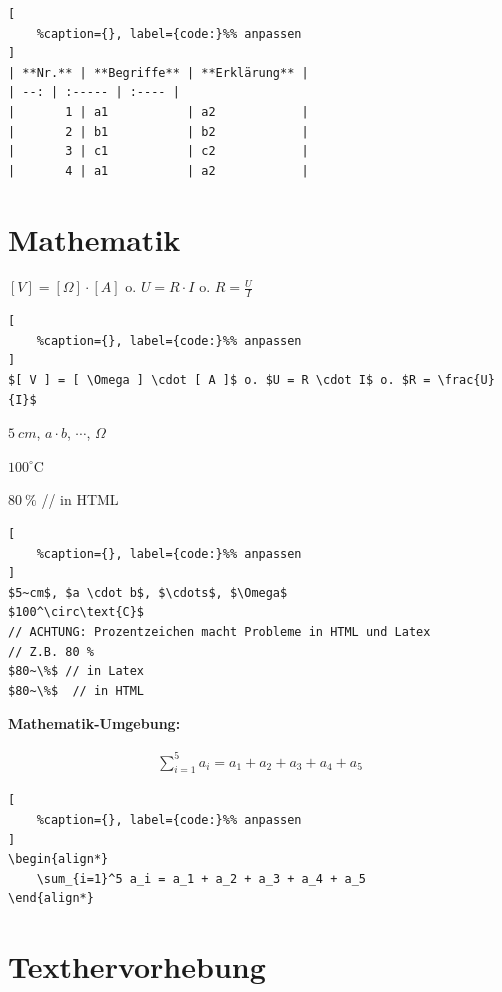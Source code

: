 \lstset{language=Bash}%
\begin{lstlisting}[
	%caption={}, label={code:}%% anpassen
]
| **Nr.** | **Begriffe** | **Erklärung** |
| --: | :----- | :---- |
|       1 | a1           | a2            |
|       2 | b1           | b2            |
|       3 | c1           | c2            |
|       4 | a1           | a2            |
\end{lstlisting}

\section{Mathematik}\label{mathematik}

$[ V ] = [ \Omega ] \cdot [ A ]$ o. $U = R \cdot I$ o.
$R = \frac{U}{I}$

\lstset{language=Bash}%
\begin{lstlisting}[
	%caption={}, label={code:}%% anpassen
]
$[ V ] = [ \Omega ] \cdot [ A ]$ o. $U = R \cdot I$ o. $R = \frac{U}{I}$
\end{lstlisting}

$5~cm$, $a \cdot b$, $\cdots$, $\Omega$

$100^\circ\text{C}$

$80~\%$ // in HTML

\lstset{language=Bash}%
\begin{lstlisting}[
	%caption={}, label={code:}%% anpassen
]
$5~cm$, $a \cdot b$, $\cdots$, $\Omega$
$100^\circ\text{C}$  
// ACHTUNG: Prozentzeichen macht Probleme in HTML und Latex 
// Z.B. 80 %
$80~\%$ // in Latex
$80~\%$  // in HTML
\end{lstlisting}

\textbf{Mathematik-Umgebung:}

\begin{align*}
    \sum_{i=1}^5 a_i = a_1 + a_2 + a_3 + a_4 + a_5
\end{align*}

\lstset{language=Bash}%
\begin{lstlisting}[
	%caption={}, label={code:}%% anpassen
]
\begin{align*}
    \sum_{i=1}^5 a_i = a_1 + a_2 + a_3 + a_4 + a_5
\end{align*}
\end{lstlisting}

\section{Texthervorhebung}\label{texthervorhebung}

